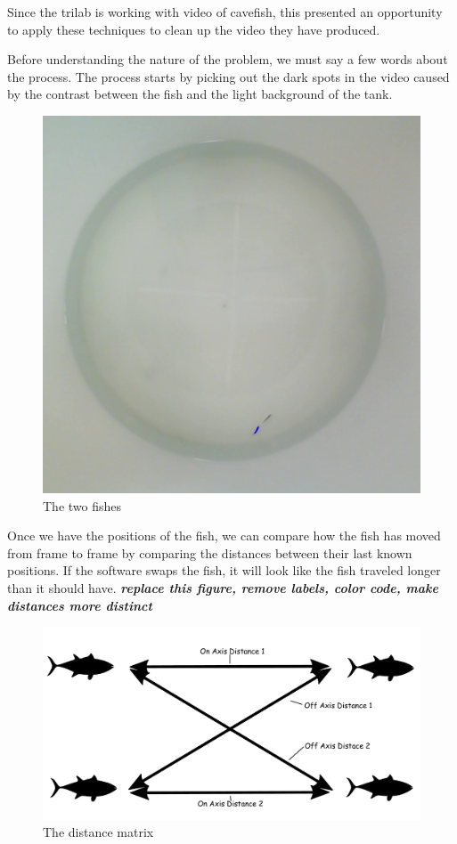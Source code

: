 \documentclass{article}
\begin{document}
Since the trilab is working with video of cavefish, this presented an opportunity to apply these techniques to clean up the video they have produced.

Before understanding the nature of the problem, we must say a few words about the process. The process starts by picking out the dark spots in the video caused by the contrast between the fish and the light background of the tank.

\begin{figure}[H]
	\centering
	\includegraphics[width=.75\linewidth]{fish}
	\caption{The two fishes}
	\label{fig:fish}
\end{figure}

Once we have the positions of the fish, we can compare how the fish has moved from frame to frame by comparing the distances between their last known positions. If the software swaps the fish, it will look like the fish traveled longer than it should have.
\textbf{\textit{replace this figure, remove labels, color code, make distances more distinct}}

\begin{figure}[H]
	\centering
	\includegraphics[width=.75\linewidth]{fish2}
	\caption{The distance matrix}
	\label{fig:fish2}
\end{figure}
\end{document}
